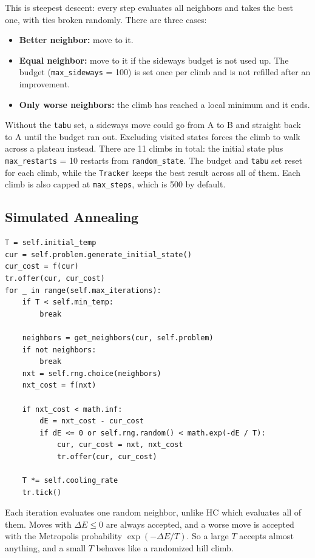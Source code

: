 \documentclass[11pt,a4paper]{article}
\newcommand{\col}[1]{\texttt{#1}}
\begin{document}
\noindent This is steepest descent: every step evaluates all neighbors and takes the best one, with
ties broken randomly. There are three cases:
\begin{itemize}
  \item \textbf{Better neighbor:} move to it.
  \item \textbf{Equal neighbor:} move to it if the sideways budget is not used up. The budget
  (\col{max\_sideways} = 100) is set once per climb and is not refilled after an improvement.
  \item \textbf{Only worse neighbors:} the climb has reached a local minimum and it ends.
\end{itemize}
Without the \col{tabu} set, a sideways move could go from A to B and straight back to A until the
budget ran out. Excluding visited states forces the climb to walk across a plateau instead. There are
11 climbs in total: the initial state plus \col{max\_restarts} = 10 restarts from \col{random\_state}.
The budget and \col{tabu} set reset for each climb, while the \col{Tracker} keeps the best result
across all of them. Each climb is also capped at \col{max\_steps}, which is 500 by default.

\subsection{Simulated Annealing}

\begin{lstlisting}
T = self.initial_temp
cur = self.problem.generate_initial_state()
cur_cost = f(cur)
tr.offer(cur, cur_cost)
for _ in range(self.max_iterations):
    if T < self.min_temp:
        break

    neighbors = get_neighbors(cur, self.problem)
    if not neighbors:
        break
    nxt = self.rng.choice(neighbors)
    nxt_cost = f(nxt)

    if nxt_cost < math.inf:
        dE = nxt_cost - cur_cost
        if dE <= 0 or self.rng.random() < math.exp(-dE / T):
            cur, cur_cost = nxt, nxt_cost
            tr.offer(cur, cur_cost)

    T *= self.cooling_rate
    tr.tick()
\end{lstlisting}

\noindent Each iteration evaluates one random neighbor, unlike HC which evaluates all of them. Moves
with $\Delta E \le 0$ are always accepted, and a worse move is accepted with the Metropolis probability
$\exp(-\Delta E / T)$. So a large $T$ accepts almost anything, and a small $T$ behaves like a randomized
hill climb.
\end{document}
